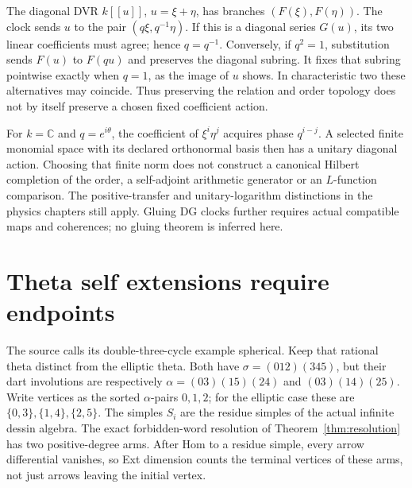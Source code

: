 \documentclass[11pt,oneside,openany]{book}
\theoremstyle{definition}\newtheorem{definition}[theorem]{Definition}
\theoremstyle{remark}\newtheorem{remark}[theorem]{Remark}
\begin{document}
The diagonal DVR $k[[u]]$, $u=\xi+\eta$, has branches $(F(\xi),F(\eta))$.
The clock sends $u$ to the pair $(q\xi,q^{-1}\eta)$. If this is a diagonal
series $G(u)$, its two linear coefficients must agree; hence $q=q^{-1}$.
Conversely, if $q^2=1$, substitution sends $F(u)$ to $F(qu)$ and preserves
the diagonal subring. It fixes that subring pointwise exactly when $q=1$,
as the image of $u$ shows. In characteristic two these alternatives may
coincide. Thus preserving the relation and order topology does not by itself
preserve a chosen fixed coefficient action.

For $k=\mathbb C$ and $q=e^{i\theta}$, the coefficient of
$\xi^i\eta^j$ acquires phase $q^{i-j}$. A selected finite monomial space
with its declared orthonormal basis then has a unitary diagonal action.
Choosing that finite norm does not construct a canonical Hilbert completion
of the order, a self-adjoint arithmetic generator or an $L$-function
comparison. The positive-transfer and unitary-logarithm distinctions in
the physics chapters still apply. Gluing DG clocks further requires actual
compatible maps and coherences; no gluing theorem is inferred here.

\section{Theta self extensions require endpoints}
The source calls its double-three-cycle example spherical. Keep that
rational theta distinct from the elliptic theta. Both have
$\sigma=(012)(345)$, but their dart involutions are respectively
$\alpha=(03)(15)(24)$ and $(03)(14)(25)$.
Write vertices as the sorted $\alpha$-pairs $0,1,2$; for the elliptic
case these are $\{0,3\},\{1,4\},\{2,5\}$.
The simples $S_i$ are the residue simples of the actual infinite dessin
algebra. The exact forbidden-word resolution of Theorem~\ref{thm:resolution}
has two positive-degree arms. After Hom to a residue simple, every
arrow differential vanishes, so Ext dimension counts the terminal vertices
of these arms, not just arrows leaving the initial vertex.
\end{document}
